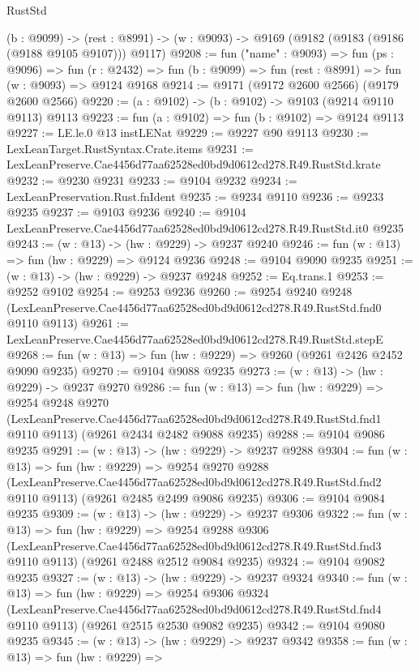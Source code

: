 \begin{lexlean}{RustStd}
\begin{coremodule}
  (b : @9099) ->
  (rest : @8991) -> (w : @9093) -> @9169 (@9182 (@9183 (@9186 (@9188 @9105 @9107))) @9117)
@9208 := fun ("name" : @9093) =>
  fun (ps : @9096) =>
  fun (r : @2432) => fun (b : @9099) => fun (rest : @8991) => fun (w : @9093) => @9124 @9168
@9214 := @9171 (@9172 @2600 @2566) (@9179 @2600 @2566)
@9220 := (a : @9102) -> (b : @9102) -> @9103 (@9214 @9110 @9113) @9113
@9223 := fun (a : @9102) => fun (b : @9102) => @9124 @9113
@9227 := LE.le.{0} @13 instLENat
@9229 := @9227 @90 @9113
@9230 := LexLeanTarget.RustSyntax.Crate.items
@9231 := LexLeanPreserve.Cae4456d77aa62528ed0bd9d0612cd278.R49.RustStd.krate
@9232 := @9230 @9231
@9233 := @9104 @9232
@9234 := LexLeanPreservation.Rust.fnIdent
@9235 := @9234 @9110
@9236 := @9233 @9235
@9237 := @9103 @9236
@9240 := @9104 LexLeanPreserve.Cae4456d77aa62528ed0bd9d0612cd278.R49.RustStd.it0 @9235
@9243 := (w : @13) -> (hw : @9229) -> @9237 @9240
@9246 := fun (w : @13) => fun (hw : @9229) => @9124 @9236
@9248 := @9104 @9090 @9235
@9251 := (w : @13) -> (hw : @9229) -> @9237 @9248
@9252 := Eq.trans.{1}
@9253 := @9252 @9102
@9254 := @9253 @9236
@9260 := @9254
    @9240
    @9248
    (LexLeanPreserve.Cae4456d77aa62528ed0bd9d0612cd278.R49.RustStd.fnd0 @9110 @9113)
@9261 := LexLeanPreserve.Cae4456d77aa62528ed0bd9d0612cd278.R49.RustStd.stepE
@9268 := fun (w : @13) => fun (hw : @9229) => @9260 (@9261 @2426 @2452 @9090 @9235)
@9270 := @9104 @9088 @9235
@9273 := (w : @13) -> (hw : @9229) -> @9237 @9270
@9286 := fun (w : @13) =>
  fun (hw : @9229) =>
  @9254
    @9248
    @9270
    (LexLeanPreserve.Cae4456d77aa62528ed0bd9d0612cd278.R49.RustStd.fnd1 @9110 @9113)
    (@9261 @2434 @2482 @9088 @9235)
@9288 := @9104 @9086 @9235
@9291 := (w : @13) -> (hw : @9229) -> @9237 @9288
@9304 := fun (w : @13) =>
  fun (hw : @9229) =>
  @9254
    @9270
    @9288
    (LexLeanPreserve.Cae4456d77aa62528ed0bd9d0612cd278.R49.RustStd.fnd2 @9110 @9113)
    (@9261 @2485 @2499 @9086 @9235)
@9306 := @9104 @9084 @9235
@9309 := (w : @13) -> (hw : @9229) -> @9237 @9306
@9322 := fun (w : @13) =>
  fun (hw : @9229) =>
  @9254
    @9288
    @9306
    (LexLeanPreserve.Cae4456d77aa62528ed0bd9d0612cd278.R49.RustStd.fnd3 @9110 @9113)
    (@9261 @2488 @2512 @9084 @9235)
@9324 := @9104 @9082 @9235
@9327 := (w : @13) -> (hw : @9229) -> @9237 @9324
@9340 := fun (w : @13) =>
  fun (hw : @9229) =>
  @9254
    @9306
    @9324
    (LexLeanPreserve.Cae4456d77aa62528ed0bd9d0612cd278.R49.RustStd.fnd4 @9110 @9113)
    (@9261 @2515 @2530 @9082 @9235)
@9342 := @9104 @9080 @9235
@9345 := (w : @13) -> (hw : @9229) -> @9237 @9342
@9358 := fun (w : @13) =>
  fun (hw : @9229) =>

\end{coremodule}
\end{lexlean}
